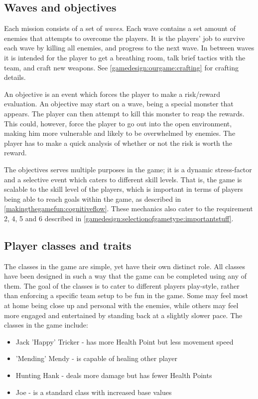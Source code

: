 \subsection{Waves and objectives}\label{gamedesign:ourgame:objectives}
Each mission consists of a set of \emph{waves}. Each wave contains a set amount of enemies that attempts to overcome the players. It is the players' job to survive each wave by killing all enemies, and progress to the next wave. In between waves it is intended for the player to get a breathing room, talk brief tactics with the team, and craft new weapons. See \ref{gamedesign:ourgame:crafting} for crafting details. 

An objective is an event which forces the player to make a risk/reward evaluation.
An objective may start on a wave, being a special monster that appears.
The player can then attempt to kill this monster to reap the rewards.
This could, however, force the player to go out into the open environment, making him more vulnerable and likely to be overwhelmed by enemies. The player has to make a quick analysis of whether or not the risk is worth the reward.

The objectives serves multiple purposes in the game; it is a dynamic
stress-factor and a selective event which caters to different skill levels.
That is, the game is scalable to the skill level of the players, which is important in terms of players being able to reach goals within the game, as described in \ref{makingthegamefun:cognitiveflow}.
These mechanics also cater to the requirement 2, 4, 5 and 6 described in \ref{gamedesign:selectionofgametype:importantstuff}.

\subsection{Player classes and traits}\label{gamedesign:ourgame:classes}
The classes in the game are simple, yet have their own distinct role.
All classes have been designed in such a way that the game can be completed using any of them.
The goal of the classes is to cater to different players play-style, rather than enforcing a specific team setup to be fun in the game.
Some may feel most at home being close up and personal with the enemies, while others may feel more engaged and entertained by standing back at a slightly slower pace.
The classes in the game include:

\begin{itemize}
\item Jack 'Happy' Tricker - has more Health Point but less movement speed
\item 'Mending' Mendy - is capable of healing other player
\item Hunting Hank - deals more damage but has fewer Health Points
\item Joe - is a standard class with increased base values
\end{itemize}

